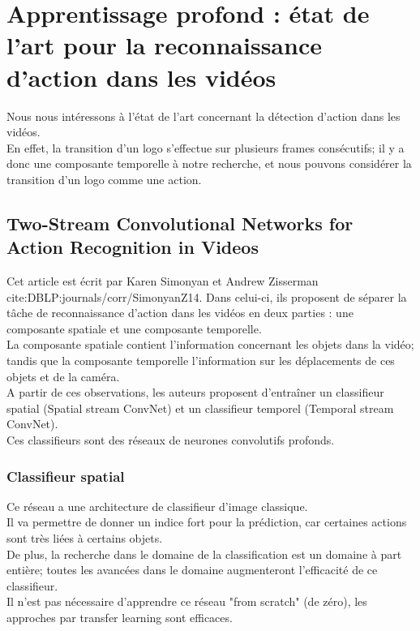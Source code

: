 \documentclass[11pt]{article}
\begin{document}
\newpage
\section{Apprentissage profond : état de l'art pour la reconnaissance d'action dans les vidéos}
\label{sec:orgd3b2d4e}
Nous nous intéressons à l'état de l'art concernant la détection d'action dans les vidéos.\\
En effet, la transition d'un logo s'effectue sur plusieurs frames consécutifs; il y a donc une composante temporelle à notre recherche, et nous pouvons considérer la transition d'un logo comme une action.\\

\subsection{Two-Stream Convolutional Networks for Action Recognition in Videos}
\label{sec:org30b41e9}
Cet article est écrit par Karen Simonyan et Andrew Zisserman cite:DBLP:journals/corr/SimonyanZ14. Dans celui-ci, ils proposent de séparer la tâche de reconnaissance d'action dans les vidéos en deux parties : une composante spatiale et une composante temporelle.\\

La composante spatiale contient l'information concernant les objets dans la vidéo; tandis que la composante temporelle l'information sur les déplacements de ces objets et de la caméra.\\
A partir de ces observations, les auteurs proposent d'entraîner un classifieur spatial (Spatial stream ConvNet) et un classifieur temporel (Temporal stream ConvNet).\\

Ces classifieurs sont des réseaux de neurones convolutifs profonds.\\

\subsubsection{Classifieur spatial}
\label{sec:org804b02e}
Ce réseau a une architecture de classifieur d'image classique.\\
Il va permettre de donner un indice fort pour la prédiction, car certaines actions sont très liées à certains objets.\\
De plus, la recherche dans le domaine de la classification est un domaine à part entière; toutes les avancées dans le domaine augmenteront l'efficacité de ce classifieur.\\
Il n'est pas nécessaire d'apprendre ce réseau "from scratch" (de zéro), les approches par transfer learning sont efficaces.\\
\end{document}
